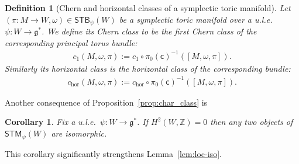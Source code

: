 \documentclass[pdftex]{sigma}
\numberwithin{equation}{section}
\newtheorem{Corollary}[Lemma]{Corollary}
\newtheorem{Definition}[Lemma]{Definition}
\begin{document}
\begin{Definition}[Chern and horizontal classes of a symplectic toric manifold]
  Let $(\pi\colon M\to W, \omega) \in {\textsf{STB}}_\psi(W)$ be a symplectic toric
  manifold over a u.l.e.\ $\psi\colon W\to {\mathfrak g}^*$. We def\/ine its {\em Chern
    class} to be the f\/irst Chern class of the corresponding principal
  torus bundle:
\begin{gather*}
c_1(M, \omega,\pi) := c_1 \circ  \pi_0({\textsf{c}})^{-1} ([M,\omega,\pi]).
\end{gather*}
Similarly its {\em horizontal class} is the horizontal class of the
corresponding bundle:
\begin{gather*}
c_{\text{hor}}(M, \omega,\pi) := c_{\text{hor}}\circ  \pi_0({\textsf{c}})^{-1} ([M,\omega,\pi]).
\end{gather*}
\end{Definition}
Another consequence of Proposition~\ref{prop:char_class} is
\begin{Corollary}\label{STB_is_a_gerbe}
  Fix a u.l.e.\ $\psi\colon W\to {\mathfrak g}^*$. If $H^2(W,{\mathbb Z})= 0$ then any two
  objects of ${\textsf{STM}}_\psi(W)$ are isomorphic.
\end{Corollary}
This corollary signif\/icantly strengthens Lemma~\ref{lem:loc-iso}.
\end{document}
